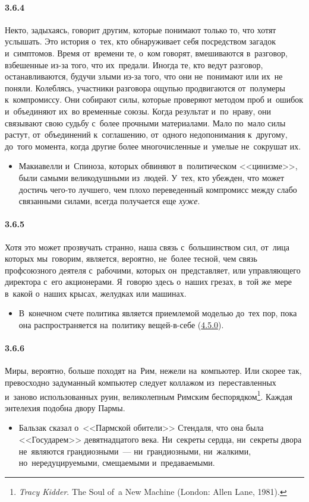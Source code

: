 \paragraph{3.6.4}\hypertarget{par:3.6.4}{} Некто, задыхаясь, говорит другим, которые понимают только то, что хотят услышать. Это история о~тех, кто обнаруживает себя посредством загадок и~симптомов. Время от~времени те, о~ком говорят, вмешиваются в~разговор, взбешенные из-за того, что их~предали. Иногда те, кто ведут разговор, останавливаются, будучи злыми из-за того, что они не~понимают или их~не поняли. Колеблясь, участники разговора ощупью продвигаются от~полумеры к~компромиссу. Они собирают силы, которые проверяют методом проб и~ошибок и~объединяют их~во временные союзы. Когда результат и~по~нраву, они связывают свою судьбу с~более прочными материалами. Мало по~мало силы
растут, от~объединений к~соглашению, от~одного недопонимания к~другому, до~того момента, когда другие более многочисленные и~умелые не~сокрушат их.
	\begin{itemize}
	\item 
	Макиавелли и~Спиноза, которых обвиняют в~политическом <<цинизме>>, были самыми великодушными из~людей. У~тех, кто убежден, что может достичь чего-то лучшего, чем плохо переведенный компромисс между слабо связанными силами, всегда получается еще {\itshape хуже}.
	\end{itemize}

\paragraph{3.6.5}\hypertarget{par:3.6.5}{} Хотя это может прозвучать странно, наша связь с~большинством сил, от~лица которых мы~говорим, является, вероятно, не~более тесной, чем связь профсоюзного деятеля с~рабочими, которых он~представляет, или управляющего директора с~его акционерами. Я~говорю здесь о~наших грезах, в~той же~мере в~какой о~наших крысах, желудках или машинах. 
	\begin{itemize}
	\item 
 В~конечном счете политика является приемлемой моделью до~тех пор, пока она распространяется на~политику вещей-в-себе (\hyperlink{par:4.5.0}{4.5.0}).
	\end{itemize}

\paragraph{3.6.6}\hypertarget{par:3.6.6}{} Миры, вероятно, больше походят на~Рим, нежели на~компьютер. Или скорее так, превосходно задуманный компьютер следует коллажом из~переставленных и~заново использованных руин, великолепным Римским беспорядком\footnote{{\itshape Tracy Kidder}. The Soul of~a New Machine (London: Allen Lane, 1981).}. Каждая энтелехия подобна двору Пармы.
	\begin{itemize}
	\item 
	Бальзак сказал о~<<Пармской обители>> Стендаля, что она была <<Государем>> девятнадцатого века. Ни~секреты сердца, ни~секреты двора не~являются грандиозными~--- ни~грандиозными, ни~жалкими, но~нередуцируемыми, смещаемыми и~предаваемыми.	
	\end{itemize}	